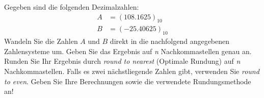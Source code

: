 \documentclass[a4paper, margins=3cm, newpage]{homework}
\begin{document}
\begin{problem}
Gegeben sind die folgenden Dezimalzahlen:
\begin{align*}
	A &= (108.1625)_{10} \\
	B &= (-25.40625)_{10}
\end{align*}
Wandeln Sie die Zahlen \(A\) und \(B\) direkt in die nachfolgend angegebenen Zahlensysteme um. Geben Sie das Ergebnis auf \emph{n} Nachkommastellen genau an. Runden Sie Ihr Ergebnis durch \emph{round to nearest} (Optimale Rundung) auf \emph{n} Nachkommastellen. Falls es zwei nächstliegende Zahlen gibt, verwenden Sie \emph{round to even}.
Geben Sie Ihre Berechnungen sowie die verwendete Rundungsmethode an!
\end{problem}
\end{document}
